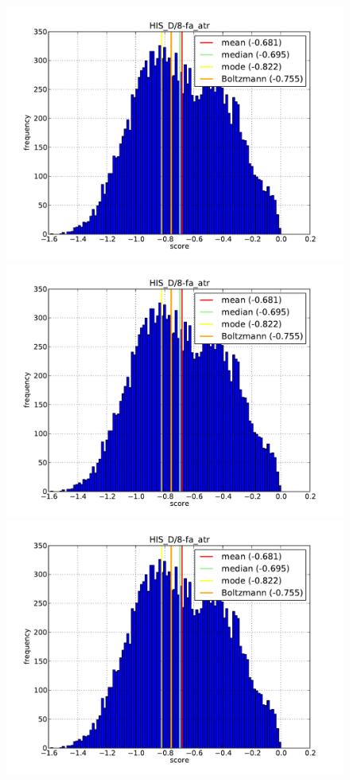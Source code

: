 \begin{figure}
  \includegraphics[width=\linewidth]{Figures/test.png}
  \includegraphics[width=\linewidth]{Figures/test.png}
  \includegraphics[width=\linewidth]{Figures/test.png}

\end{figure}
